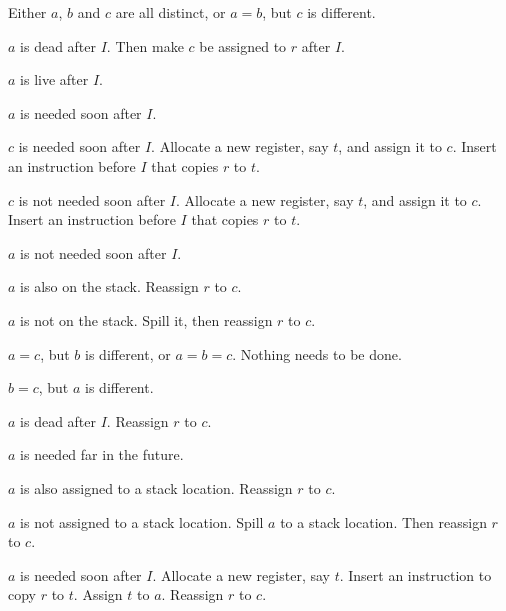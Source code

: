 \begin{legal}
\item Either $a$, $b$ and $c$ are all distinct, or $a = b$, but $c$ is
  different.
  \begin{legal}
  \item $a$ is dead after $I$.  Then make $c$ be assigned to $r$
    after $I$.
  \item $a$ is live after $I$.
    \begin{legal}
    \item $a$ is needed soon after $I$.
      \begin{legal}
      \item $c$ is needed soon after $I$. Allocate a new register, say
        $t$, and assign it to $c$.  Insert an instruction before $I$
        that copies $r$ to $t$.
      \item $c$ is not needed soon after $I$.  Allocate a new
        register, say $t$, and assign it to $c$.  Insert an
        instruction before $I$ that copies $r$ to $t$.
      \end{legal}
    \item $a$ is not needed soon after $I$.
      \begin{legal}
      \item $a$ is also on the stack.  Reassign $r$ to $c$.
      \item $a$ is not on the stack.  Spill it, then reassign $r$ to
        $c$.
      \end{legal}
    \end{legal}
  \end{legal}
\item $a = c$, but $b$ is different, or $a = b = c$. Nothing needs to
  be done.
\item $b = c$, but $a$ is different.
  \begin{legal}
  \item $a$ is dead after $I$.  Reassign $r$ to $c$.
  \item $a$ is needed far in the future.
    \begin{legal}
    \item $a$ is also assigned to a stack location.  Reassign $r$ to $c$.
    \item $a$ is not assigned to a stack location.  Spill $a$ to a
      stack location.  Then reassign $r$ to $c$.
    \end{legal}
  \item $a$ is needed soon after $I$.  Allocate a new register, say
    $t$.  Insert an instruction to copy $r$ to $t$.  Assign $t$ to
    $a$.  Reassign $r$ to $c$.
  \end{legal}
\end{legal}

